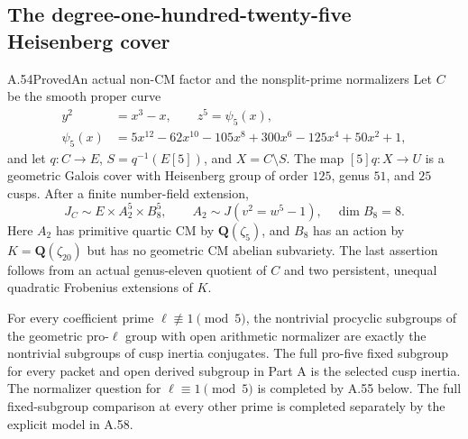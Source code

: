 \subsection{The degree-one-hundred-twenty-five Heisenberg cover}

\begin{statement}{A.54}{Proved}{An actual non-CM factor and the nonsplit-prime normalizers}
Let \(C\) be the smooth proper curve
\[
 \begin{aligned}
 y^2&=x^3-x,\qquad z^5=\psi _5(x),\\
 \psi _5(x)&=5x^{12}-62x^{10}-105x^8+300x^6-125x^4+50x^2+1,
 \end{aligned}
                                                               \tag{A.54.1}
\]
and let \(q:C\to E\), \(S=q^{-1}(E[5])\), and \(X=C\setminus S\).
The map \([5]q:X\to U\) is a geometric Galois cover
with Heisenberg group of order \(125\), genus \(51\), and \(25\) cusps.
After a finite number-field extension,
\[
 J_C\sim E\times A_2^5\times B_8^5,\qquad
 A_2\sim J(v^2=w^5-1),\quad \dim B_8=8.             \tag{A.54.2}
\]
Here \(A_2\) has primitive quartic CM by \(\mathbf Q(\zeta _5)\),
and \(B_8\) has an action by \(K=\mathbf Q(\zeta _{20})\)
but has no geometric CM abelian subvariety.
The last assertion follows from an actual genus-eleven quotient of \(C\)
and two persistent, unequal quadratic Frobenius extensions of \(K\).

For every coefficient prime \(\ell\not\equiv1\pmod5\),
the nontrivial procyclic subgroups of the geometric pro-\(\ell\) group
with open arithmetic normalizer are exactly the nontrivial subgroups
of cusp inertia conjugates. The full pro-five fixed subgroup for every
packet and open derived subgroup in Part A is the selected cusp inertia.
The normalizer question for \(\ell\equiv1\pmod5\) is completed
by A.55 below. The full fixed-subgroup comparison at every other
prime is completed separately by the explicit model in A.58.
\end{statement}

